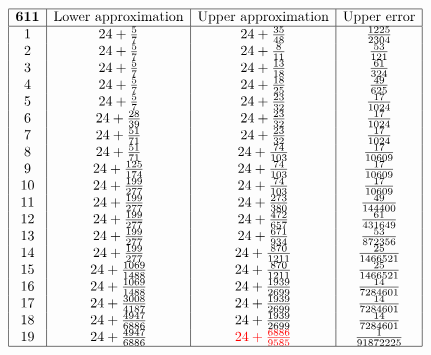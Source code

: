 \documentclass{amsart}
\begin{document}
$$\begin{array}{|c|c|c|c|}
 \hline
 {\bf 611}&\text{Lower approximation}&\text{Upper approximation}&\text{Upper error}\\
 \hline
 1&24+\frac{5}{7}&24+\frac{35}{48}&\frac{1225}{2304}\\
2&24+\frac{5}{7}&24+\frac{8}{11}&\frac{53}{121}\\
3&24+\frac{5}{7}&24+\frac{13}{18}&\frac{61}{324}\\
4&24+\frac{5}{7}&24+\frac{18}{25}&\frac{49}{625}\\
5&24+\frac{5}{7}&24+\frac{23}{32}&\frac{17}{1024}\\
6&24+\frac{28}{39}&24+\frac{23}{32}&\frac{17}{1024}\\
7&24+\frac{51}{71}&24+\frac{23}{32}&\frac{17}{1024}\\
8&24+\frac{51}{71}&24+\frac{74}{103}&\frac{17}{10609}\\
9&24+\frac{125}{174}&24+\frac{74}{103}&\frac{17}{10609}\\
10&24+\frac{199}{277}&24+\frac{74}{103}&\frac{17}{10609}\\
11&24+\frac{199}{277}&24+\frac{273}{380}&\frac{49}{144400}\\
12&24+\frac{199}{277}&24+\frac{472}{657}&\frac{61}{431649}\\
13&24+\frac{199}{277}&24+\frac{671}{934}&\frac{53}{872356}\\
14&24+\frac{199}{277}&24+\frac{870}{1211}&\frac{25}{1466521}\\
15&24+\frac{1069}{1488}&24+\frac{870}{1211}&\frac{25}{1466521}\\
16&24+\frac{1069}{1488}&24+\frac{1939}{2699}&\frac{14}{7284601}\\
17&24+\frac{3008}{4187}&24+\frac{1939}{2699}&\frac{14}{7284601}\\
18&24+\frac{4947}{6886}&24+\frac{1939}{2699}&\frac{14}{7284601}\\
19&24+\frac{4947}{6886}&{\color{red}24+\frac{6886}{9585}}&\frac{1}{91872225}\\
 \hline
\end{array}$$
\end{document}
